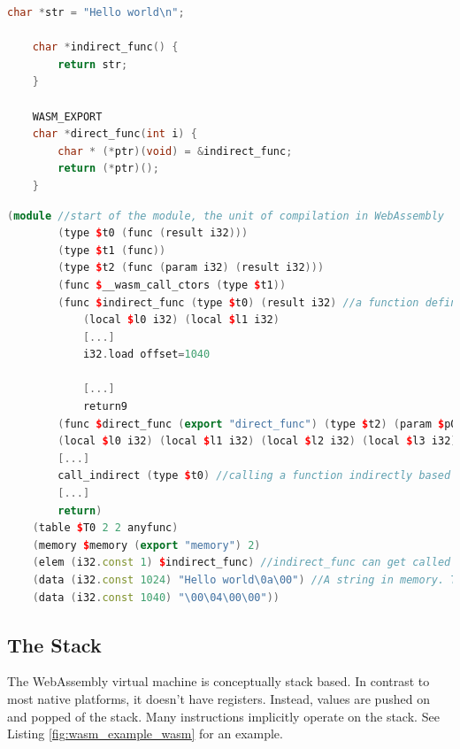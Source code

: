 \documentclass[sigconf]{acmart}
\begin{document}
\begin{lstlisting}[language=C++, caption={A C program, which, when compiled without optimizations, gets translated to the code in Observe \ref{fig:wasm_example_wasm}.}, label=fig:wasm_example_c]
	char *str = "Hello world\n";

	char *indirect_func() {
		return str;
	}

	WASM_EXPORT
	char *direct_func(int i) { 
		char * (*ptr)(void) = &indirect_func;
		return (*ptr)();
	} 
\end{lstlisting}

\begin{lstlisting}[language=C++, caption={The C program in Listing \ref{fig:wasm_example_c} gets compiled to this WebAssembly program (with uninteresting parts removed). Observe the indirect call, function table and memory region.}, label={fig:wasm_example_wasm}]
	(module //start of the module, the unit of compilation in WebAssembly
		(type $t0 (func (result i32)))
		(type $t1 (func))
		(type $t2 (func (param i32) (result i32)))
		(func $__wasm_call_ctors (type $t1))
		(func $indirect_func (type $t0) (result i32) //a function definition
			(local $l0 i32) (local $l1 i32)
			[...]
			i32.load offset=1040
			
			[...]
			return9
		(func $direct_func (export "direct_func") (type $t2) (param $p0 i32) (result i32)
		(local $l0 i32) (local $l1 i32) (local $l2 i32) (local $l3 i32) (local $l4 i32) (local $l5 i32) (local $l6 i32) (local $l7 i32)
		[...]
		call_indirect (type $t0) //calling a function indirectly based on the index pushed onto the stack
		[...]
		return)
	(table $T0 2 2 anyfunc)
	(memory $memory (export "memory") 2) 
	(elem (i32.const 1) $indirect_func) //indirect_func can get called indirectly by pushing '1' onto the stack 
	(data (i32.const 1024) "Hello world\0a\00") //A string in memory. There exists no constant storage in WebAssembly.
	(data (i32.const 1040) "\00\04\00\00"))
\end{lstlisting}

\subsection{The Stack}
\label{sec:wasm_stack}
The WebAssembly virtual machine is conceptually stack based. In contrast to most native platforms, it doesn't have registers. Instead, values are pushed on and popped of the stack. Many instructions implicitly operate on the stack. See Listing \ref{fig:wasm_example_wasm} for an example.
\end{document}
